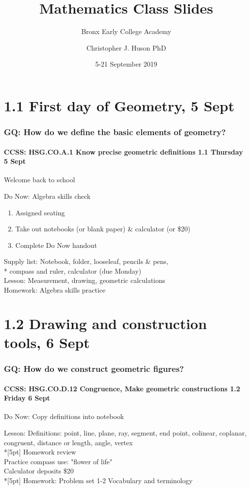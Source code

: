 \documentclass{beamer}
\title{Mathematics Class Slides}
\subtitle{Bronx Early College Academy}
\author{Christopher J. Huson PhD}
\date{5-21 September 2019}
\begin{document}
\frame{\titlepage}
\section[Outline]{}
\frame{\tableofcontents}

\section{1.1 First day of Geometry, 5 Sept}
\frame
{
  \frametitle{GQ: How do we define the basic elements of geometry?}
  \framesubtitle{CCSS: HSG.CO.A.1 Know precise geometric definitions \hfill \alert{1.1 Thursday 5 Sept}}

  Welcome back to school
  \begin{block}{Do Now: Algebra skills check}
  \begin{enumerate}
      \item Assigned seating
      \item Take out notebooks (or blank paper) \& calculator (or \$20)
      \item Complete Do Now handout
  \end{enumerate}
  \end{block}
  Supply list: Notebook, folder, looseleaf, pencils \& pens, \\*
  compass and ruler, calculator \alert{(due Monday)} \\
  Lesson: Measurement, drawing, geometric calculations \\
  Homework: Algebra skills practice
}

\section{1.2 Drawing and construction tools, 6 Sept}
\frame
{
  \frametitle{GQ: How do we construct geometric figures?}
  \framesubtitle{CCSS: HSG.CO.D.12 Congruence, Make geometric constructions  \hfill \alert{1.2 Friday 6 Sept}}

  \begin{block}{Do Now: Copy definitions into notebook}
  \end{block}
  Lesson: Definitions: point, line, plane, ray, segment, end point, colinear, coplanar, congruent, distance or length, angle, vertex \\*[5pt]
  Homework review\\
  Practice compass use: "flower of life"\\
  Calculator deposits \$20 \\*[5pt]
  Homework: Problem set 1-2 Vocabulary and terminology
}
\end{document}
